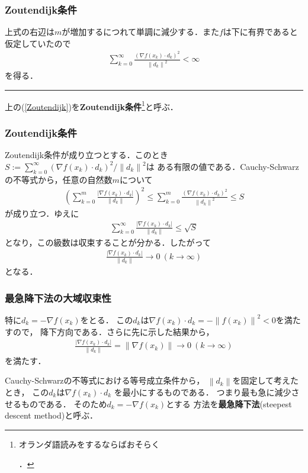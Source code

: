 \documentclass[10pt,hyperref={unicode}]{beamer}
\newcommand{\braref}[1]{{\fontfamily{cmr}\selectfont (\ref{#1})}}
\newcommand{\parentheses}[1]{\left(#1\right)}
\newcommand{\norm}[1]{\left\|#1\right\|}
\newcommand{\absolute}[1]{\left|#1\right|}
\begin{document}
\begin{frame}
\frametitle{Zoutendijk条件}
上式の右辺は$m$が増加するにつれて単調に減少する．また$f$は下に有界であると仮定していたので
\begin{align}
    \sum_{k = 0}^\infty \frac{\parentheses{\nabla f \parentheses{x_k} \cdot d_k}^2}{\left\|d_k\right\|^2} < \infty \tag{Zoutendijk} \label{Zoutendijk}
\end{align}
を得る．\hfill \rule{5pt}{10pt}

\bigskip

上の\braref{Zoutendijk}を\textbf{Zoutendijk条件}\footnote[frame]{オランダ語読みをするならばおそらく\begin{ipafont}\end{ipafont}．}と呼ぶ．
\end{frame}


\begin{frame}
\frametitle{Zoutendijk条件}
Zoutendijk条件が成り立つとする．このとき
$S := \sum_{k = 0}^\infty \parentheses{\nabla f \parentheses{x_k} \cdot d_k}^2/\norm{d_k}^2$は
ある有限の値である．Cauchy-Schwarzの不等式から，任意の自然数$m$について
\begin{align*}
    \parentheses{\sum_{k = 0}^m \frac{\absolute{\nabla f \parentheses{x_k} \cdot d_k}}{\left\|d_k\right\|}}^2 \leq
    \sum_{k = 0}^m \frac{\parentheses{\nabla f \parentheses{x_k} \cdot d_k}^2}{\left\|d_k\right\|^2} \leq S
\end{align*}
が成り立つ．ゆえに
\begin{align*}
    \sum_{k = 0}^\infty \frac{\absolute{\nabla f \parentheses{x_k} \cdot d_k}}{\left\|d_k\right\|} \leq \sqrt{S}
\end{align*}
となり，この級数は収束することが分かる．したがって
\begin{align*}
    \frac{\absolute{\nabla f \parentheses{x_k} \cdot d_k}}{\left\|d_k\right\|} \to 0 \ \parentheses{k \to \infty}
\end{align*}
となる．
\end{frame}

\begin{frame}
\frametitle{最急降下法の大域収束性}
特に$d_k = - \nabla f\parentheses{x_k}$をとる．
この$d_k$は$\nabla f\parentheses{x_k} \cdot d_k = - \norm{f\parentheses{x_k}}^2 < 0$を満たすので，
降下方向である．さらに先に示した結果から，
\begin{align*}
    \frac{\absolute{\nabla f \parentheses{x_k} \cdot d_k}}{\norm{d_k}} = \norm{\nabla f\parentheses{x_k}}  \to 0 \ \parentheses{k \to \infty}
\end{align*}
を満たす．

\bigskip

Cauchy-Schwarzの不等式における等号成立条件から，
$\norm{d_k}$を固定して考えたとき，
この$d_k$は$\nabla f\parentheses{x_k} \cdot d_k$
を最小にするものである．
つまり最も急に減少させるものである．
そのため$d_k = - \nabla f\parentheses{x_k}$とする
方法を\textbf{最急降下法}(steepest descent method)と呼ぶ．
\end{frame}
\end{document}
